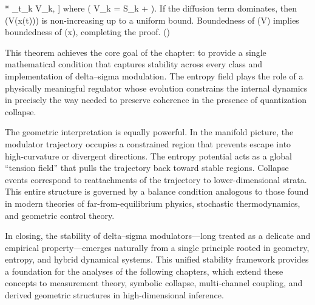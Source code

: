 * \sum_{t_{k} \in [t_{0}, t_{1}]} \Delta V_{k},
  ]
  where ( \Delta V_{k} = \alpha \Delta S_{k} +  ).
  If the diffusion term dominates, then (V(x(t))) is non-increasing up to a uniform bound.
  Boundedness of (V) implies boundedness of (x), completing the proof. \hfill(\square)

\medskip

This theorem achieves the core goal of the chapter: to provide a single mathematical condition that captures stability across every class and implementation of delta–sigma modulation. The entropy field plays the role of a physically meaningful regulator whose evolution constrains the internal dynamics in precisely the way needed to preserve coherence in the presence of quantization collapse.

The geometric interpretation is equally powerful. In the manifold picture, the modulator trajectory occupies a constrained region that prevents escape into high-curvature or divergent directions. The entropy potential acts as a global “tension field” that pulls the trajectory back toward stable regions. Collapse events correspond to reattachments of the trajectory to lower-dimensional strata. This entire structure is governed by a balance condition analogous to those found in modern theories of far-from-equilibrium physics, stochastic thermodynamics, and geometric control theory.

In closing, the stability of delta–sigma modulators—long treated as a delicate and empirical property—emerges naturally from a single principle rooted in geometry, entropy, and hybrid dynamical systems. This unified stability framework provides a foundation for the analyses of the following chapters, which extend these concepts to measurement theory, symbolic collapse, multi-channel coupling, and derived geometric structures in high-dimensional inference.

